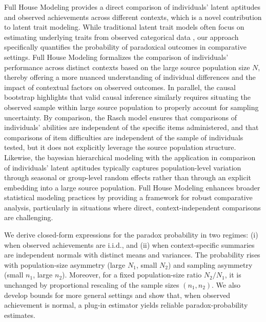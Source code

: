 \documentclass[12pt]{article}
\begin{document}
 Full House Modeling provides a direct comparison of individuals' latent aptitudes and observed achievements across different contexts, which is a novel contribution to latent trait modeling. While traditional latent trait models  \citep{bartholomew2011latent} often focus on estimating underlying traits from observed categorical data , our approach specifically quantifies the probability of paradoxical outcomes in comparative settings. 
 Full House Modeling formalizes the comparison of individuals' performance across distinct contexts based on the large source population size $N$, thereby offering a more nuanced understanding of individual differences and the impact of contextual factors on observed outcomes. In parallel, the causal bootstrap \citep{imbens2018causal} highlights that valid causal inference similarly requires situating the observed sample within large source population to properly account for sampling uncertainty. By comparison, the Rasch model \citep{bond2013applying} ensures that comparisons of individuals' abilities are independent of the specific items administered, and that comparisons of item difficulties are independent of the sample of individuals tested, but it does not explicitly leverage the source population structure. Likewise, the bayesian hierarchical modeling \citep{BRL99} with the application in comparison of individuals' latent aptitudes typically captures population-level variation through seasonal or group-level random effects rather than through an explicit embedding into a large source population. Full House Modeling enhances broader statistical modeling practices by providing a framework for robust comparative analysis, particularly in situations where direct, context-independent comparisons are challenging.

We derive closed-form expressions for the paradox probability in two regimes: (i) when observed achievements are i.i.d., and (ii) when context-specific summaries are independent normals with distinct means and variances. The probability rises with population-size asymmetry (large $N_1$, small $N_2$) and sampling asymmetry (small $n_1$, large $n_2$). Moreover, for a fixed population-size ratio $N_2/N_1$, it is unchanged by proportional rescaling of the sample sizes $(n_1,n_2)$. We also develop bounds for more general settings and show that, when observed achievement is normal, a plug-in estimator yields reliable paradox-probability estimates.
\end{document}
